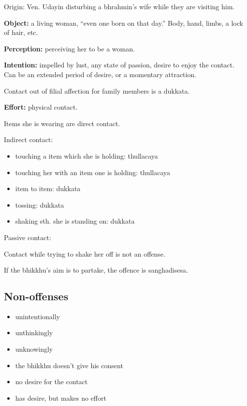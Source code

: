 \begin{multicols}{2}

Origin: Ven. Udayin disturbing a bhrahmin's wife while they are visiting
him.

\textbf{Object:} a living woman, ``even one born on that day.'' Body,
hand, limbs, a lock of hair, etc.

\textbf{Perception:} perceiving her to be a woman.

\textbf{Intention:} impelled by lust, any state of passion, desire to
enjoy the contact. Can be an extended period of desire, or a momentary
attraction.

Contact out of filial affection for family members is a dukkata.

\textbf{Effort:} physical contact.

Items she is wearing are direct contact.

Indirect contact:

\begin{itemize}
\tightlist
\item
  touching a item which she is holding: thullacaya
\item
  touching her with an item one is holding: thullacaya
\item
  item to item: dukkata
\item
  tossing: dukkata
\item
  shaking sth. she is standing on: dukkata
\end{itemize}

Passive contact:

Contact while trying to shake her off is not an offense.

If the bhikkhu's aim is to partake, the offence is sanghadisesa.

\subsection{Non-offenses}

\begin{itemize}
\tightlist
\item
  unintentionally
\item
  unthinkingly
\item
  unknowingly
\item
  the bhikkhu doesn't give his consent
\item
  no desire for the contact
\item
  has desire, but makes no effort
\end{itemize}

\end{multicols}

